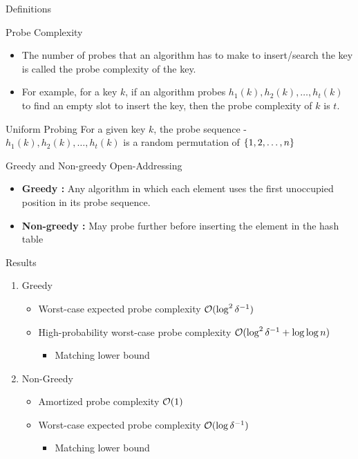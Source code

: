 \documentclass{beamer}
\begin{document}
\begin{frame} {Definitions}
	\begin{block}{Probe Complexity}
		\begin{itemize}
			\item The number of probes that an algorithm has to make to insert/search the key is called the probe complexity of the key.
			\item For example, for a key $k$, if an algorithm probes $h_1(k), h_2(k), \ldots, h_t(k)$ to find an empty slot to insert the key, then the probe complexity of $k$ is $t$.
		\end{itemize}
	\end{block}

\begin{block}{Uniform Probing}
	For a given key $k$, the probe sequence - $h_1(k), h_2(k), \ldots, h_t(k)$ is a random permutation of $\left\{ 1, 2, \ldots,n  \right\}$
\end{block}
\end{frame}


\begin{frame}{Greedy and Non-greedy Open-Addressing}
	\begin{itemize}
		\item {\bf Greedy :}  Any algorithm in which each element uses the first unoccupied position in its probe sequence.
		\item {\bf Non-greedy :} May probe further before inserting the element in the hash table
	\end{itemize}
	
\end{frame}

\begin{frame}{Results}
	
	\begin{enumerate}
		\item Greedy
		\begin{itemize}
			\item Worst-case expected probe complexity ${\cal O}(\log^2{\delta^{-1}})$ %
			\item High-probability worst-case probe complexity ${\cal O}(\log^2{\delta^{-1}} + \log{\log{n}})$
			\begin{itemize}
				\item Matching lower bound
			\end{itemize}
		\end{itemize}
	\vspace{10mm}
	\item Non-Greedy 
	\begin{itemize}
		\item Amortized probe complexity ${\cal O}(1)$
		\item Worst-case expected probe complexity ${\cal O}(\log{\delta^{-1}})$ %
		\begin{itemize}
			\item Matching lower bound
		\end{itemize}
	\end{itemize}
	\end{enumerate}
\end{frame}
\end{document}
